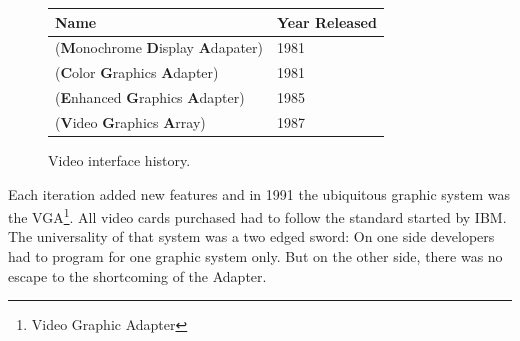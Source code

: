 \documentclass[book.tex]{subfiles}
\begin{document}
 \begin{figure}[H]
\centering  
\begin{tabularx}{\textwidth}{ X  Y }
  \toprule
  \textbf{Name} &  \textbf{Year Released} \\
  \toprule {}
   (\textbf{M}onochrome
   \textbf{D}isplay
   \textbf{A}dapater) & 1981 
   \\ 
   (\textbf{C}olor
   \textbf{G}raphics
   \textbf{A}dapter) & 1981 
    \\ 
   (\textbf{E}nhanced
   \textbf{G}raphics
   \textbf{A}dapter) & 1985
   \\ 
   (\textbf{V}ideo
   \textbf{G}raphics
   \textbf{A}rray)  & 1987
    \\
  \toprule
\end{tabularx}
\caption{Video interface history.}\label{fig:vga_history}
\end{figure}

Each iteration added new features and in 1991 the ubiquitous graphic system was the VGA\footnote{Video Graphic Adapter}. All video cards purchased had to follow the standard started by IBM. The universality of that system was a two edged sword: On one side developers had to program for one graphic system only. But on the other side, there was no escape to the shortcoming of the Adapter.\\
\end{document}

